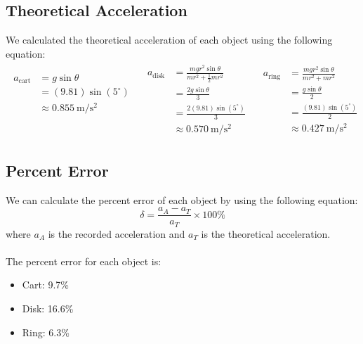 \documentclass[article, 11pt]{article}
\begin{document}
    \subsection{Theoretical Acceleration}
    We calculated the theoretical acceleration of each object using the following equation:
    \begin{align*}
        \begin{aligned}
            a_\text{cart} &= g\sin{\theta} \\ &= (9.81)\sin(5^{\circ}) \\
            &\approx \SI{0.855}{\meter/\second^2} \\
            \\
            \\
        \end{aligned} \quad
        \begin{aligned}
            a_\text{disk} &= \frac{mgr^2\sin\theta}{mr^2 + \frac{1}{2}mr^2} \\
            &= \frac{2g\sin\theta}{3} \\
            &= \frac{2(9.81)\sin(5^{\circ})}{3} \\
            &\approx \SI{0.570}{\meter/\second^2}    
        \end{aligned} \quad
        \begin{aligned}
            a_\text{ring} &= \frac{mgr^2\sin\theta}{mr^2 + mr^2} \\
            &= \frac{g\sin\theta}{2} \\
            &= \frac{(9.81)\sin(5^{\circ})}{2} \\
            &\approx \SI{0.427}{\meter/\second^2}    
        \end{aligned}
    \end{align*}
    \subsection{Percent Error}
    We can calculate the percent error of each object by using the following equation:
    \begin{equation*}
        \delta = \frac{a_A - a_T}{a_T} \times 100\%
    \end{equation*}
    where $a_A$ is the recorded acceleration and $a_T$ is the theoretical acceleration. \\
    \\
    The percent error for each object is:
    \begin{itemize}
        \item Cart: 9.7\%
        \item Disk: 16.6\%
        \item Ring: 6.3\%
    \end{itemize}
\end{document}
